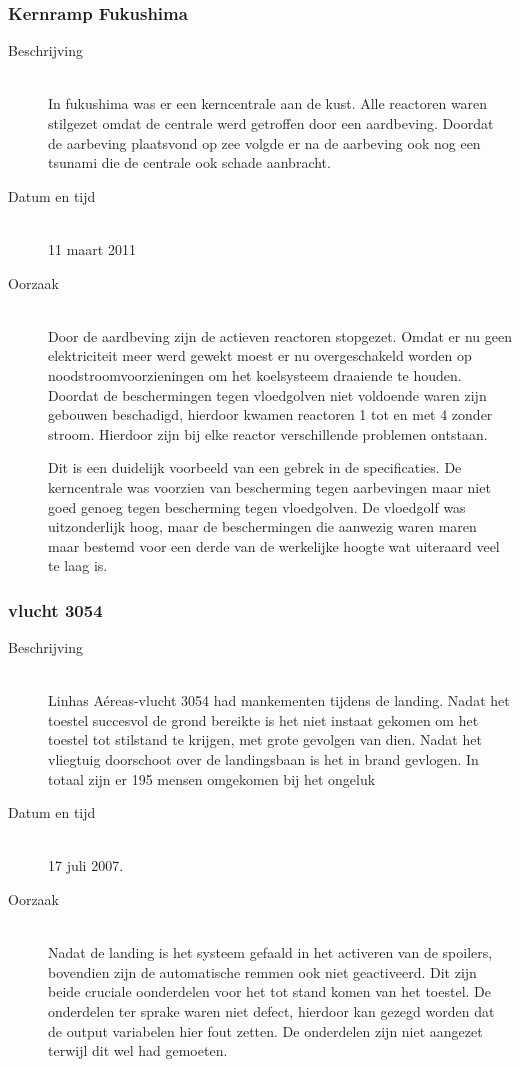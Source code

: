 \documentclass{article}%
\begin{document}
\subsubsection{Kernramp Fukushima}
\begin{description}
\item [Beschrijving] \hfill \\
In fukushima was er een kerncentrale aan de kust. Alle reactoren waren stilgezet omdat de centrale werd getroffen door een aardbeving. Doordat de aarbeving plaatsvond op zee volgde er na de aarbeving ook nog een tsunami die de centrale ook schade aanbracht.
\item [Datum en tijd] \hfill \\
11 maart 2011
\item [Oorzaak] \hfill \\
Door de aardbeving zijn de actieven reactoren stopgezet. Omdat er nu geen elektriciteit meer werd gewekt moest er nu overgeschakeld worden op noodstroomvoorzieningen om het koelsysteem draaiende te houden. Doordat de beschermingen tegen vloedgolven niet voldoende waren zijn gebouwen beschadigd, hierdoor kwamen reactoren 1 tot en met 4 zonder stroom. Hierdoor zijn bij elke reactor verschillende problemen ontstaan.

Dit is een duidelijk voorbeeld van een gebrek in de specificaties. De kerncentrale was voorzien van bescherming tegen aarbevingen maar niet goed genoeg tegen bescherming tegen vloedgolven. De vloedgolf was uitzonderlijk hoog, maar de beschermingen die aanwezig waren maren maar bestemd voor een derde van de werkelijke hoogte wat uiteraard veel te laag is.

\end{description}
\subsubsection{vlucht 3054}
\begin{description}
\item [Beschrijving] \hfill \\
Linhas Aéreas-vlucht 3054 had mankementen tijdens de landing. Nadat het toestel succesvol de grond bereikte is het niet instaat gekomen om het toestel tot stilstand te krijgen, met grote gevolgen van dien. Nadat het vliegtuig doorschoot over de landingsbaan is het in brand gevlogen. In totaal zijn er 195 mensen omgekomen bij het ongeluk

\item [Datum en tijd] \hfill \\
17 juli 2007.
\item [Oorzaak] \hfill \\
Nadat de landing is het systeem gefaald in het activeren van de spoilers, bovendien zijn de automatische remmen ook niet geactiveerd. Dit zijn beide cruciale oonderdelen voor het tot stand komen van het toestel. De onderdelen ter sprake waren niet defect, hierdoor kan gezegd worden dat de output variabelen hier fout zetten. De onderdelen zijn niet aangezet terwijl dit wel had gemoeten.

\end{description}
\end{document}
